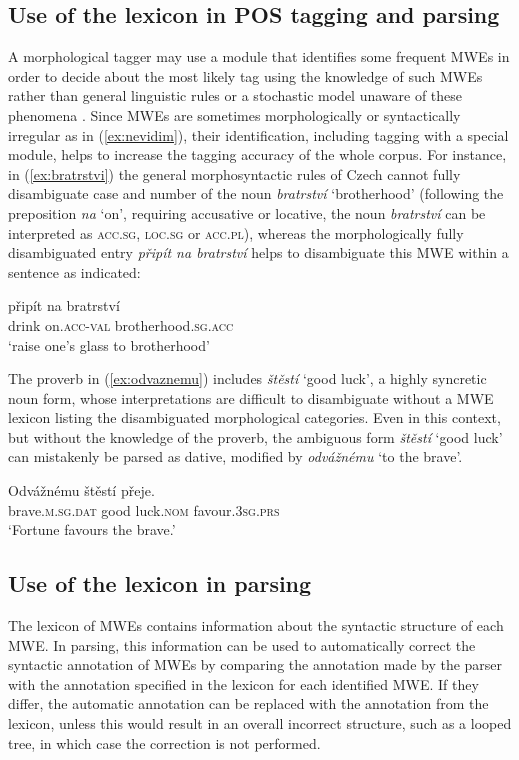 \documentclass[output=paper,colorlinks,citecolor=brown]{langscibook}
\begin{document}
\subsection{Use of the lexicon in POS tagging and parsing}
A morphological tagger may
use a module that identifies some frequent MWEs in order to decide about the most likely tag using the knowledge of such MWEs rather than general linguistic rules or a stochastic model unaware of these phenomena \citep{Hnatkova:Petkevic:2017}.
Since MWEs are sometimes morphologically or syntactically irregular as in (\ref{ex:nevidim}), their identification, including tagging with a special module, helps to increase the tagging accuracy of the whole corpus. For instance, in (\ref{ex:bratrstvi}) the general morphosyntactic rules of Czech cannot fully disambiguate case and number of the noun \emph{bratrství} ‘brotherhood’ (following the preposition \emph{na} ‘on’, requiring accusative or locative, the noun \emph{bratrství} can be interpreted as \textsc{acc.sg, loc.sg} or \textsc{acc.pl}), whereas the morphologically fully disambiguated entry \textit{připít na bratrství} helps to disambiguate this MWE within a sentence as indicated:

\ea \label{ex:bratrstvi}
\gll připít na bratrství\\
     drink on.\textsc{acc-val} brotherhood.\textsc{sg.acc}\\
\glt `raise one's glass to brotherhood'
\z  

\noindent
The proverb in (\ref{ex:odvaznemu}) includes \emph{štěstí} ‘good luck’, a highly syncretic noun form, whose interpretations are difficult to disambiguate without a MWE lexicon listing the disambiguated morphological categories. Even in this context, but without the knowledge of the proverb, the ambiguous form \emph{štěstí} ‘good luck’ can mistakenly be parsed as dative, modified by \emph{odvážnému} ‘to the brave’.

\ea \label{ex:odvaznemu}
\gll Odvážnému štěstí přeje.\\
     brave.\textsc{m.sg.dat} {good luck}.\textsc{nom} favour.\textsc{3sg.prs}\\
\glt `Fortune favours the brave.'
\z  

\subsection{Use of the lexicon in parsing}

The lexicon of MWEs contains information about the syntactic structure of each MWE. In parsing, this information can be used to automatically correct the syntactic annotation of MWEs by comparing the annotation made by the parser with the annotation specified in the lexicon for each identified MWE. If they differ, the automatic annotation can be replaced with the annotation from the lexicon, unless this would result in an overall incorrect structure, such as a looped tree, in which case the correction is not performed.
\end{document}
